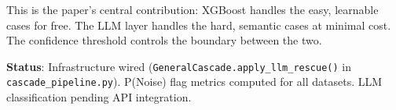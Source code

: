 \documentclass[11pt]{article}
\begin{document}
This is the paper's central contribution: XGBoost handles the easy, learnable cases for free. The LLM layer handles the hard, semantic cases at minimal cost. The confidence threshold controls the boundary between the two.

\textbf{Status}: Infrastructure wired (\texttt{GeneralCascade.apply\_llm\_rescue()} in \texttt{cascade\_pipeline.py}). P(Noise) flag metrics computed for all datasets. LLM classification pending API integration.
\end{document}
